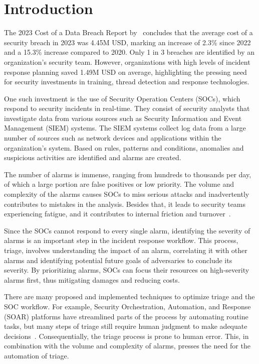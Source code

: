 \section{Introduction}
\label{sec:introduction}

The 2023 Cost of a Data Breach Report by\ \citet{ibm2023cost} concludes that the average cost of a security breach in
2023 was 4.45M USD, marking an increase of 2.3\% since 2022 and a 15.3\% increase compared to 2020.
Only 1 in 3 breaches are identified by an organization's security team.
However, organizations with high levels of incident response planning saved 1.49M USD on average, highlighting the
pressing need for security investments in training, thread detection and response technologies.

One such investment is the use of Security Operation Centers (SOCs), which respond to security incidents in real-time.
They consist of security analysts that investigate data from various sources such as Security Information and Event
Management (SIEM) systems.
The SIEM systems collect log data from a large number of sources such as network devices and applications within the
organization's system.
Based on rules, patterns and conditions, anomalies and suspicious activities are identified and alarms are created.

The number of alarms is immense, ranging from hundreds to thousands per day, of which a large portion are false
positives or low priority.
The volume and complexity of the alarms causes SOCs to miss serious attacks and inadvertently contributes to mistakes in
the analysis.
Besides that, it leads to security teams experiencing fatigue, and it contributes to internal friction and
turnover\ \citep{orca2022fatigue}.

Since the SOCs cannot respond to every single alarm, identifying the severity of alarms is an important step in the
incident response workflow.
This process, triage, involves understanding the impact of an alarm, correlating it with other alarms and identifying
potential future goals of adversaries to conclude its severity.
By prioritizing alarms, SOCs can focus their resources on high-severity alarms first, thus mitigating damages and
reducing costs.

There are many proposed and implemented techniques to optimize triage and the SOC workflow.
For example, Security Orchestration, Automation, and Response (SOAR) platforms have streamlined parts of the process by
automating routine tasks, but many steps of triage still require human judgment to make adequate
decisions\ \citep{chuvakin2019triaging}.
Consequentially, the triage process is prone to human error.
This, in combination with the volume and complexity of alarms, presses the need for the automation of triage.

